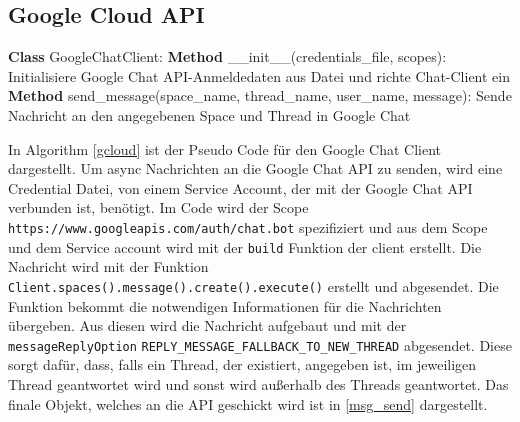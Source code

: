 \subsection{Google Cloud API}
\label{s:ent:capi}
\begin{algorithm}
    \caption{Google Chat Client}
    \begin{algorithmic}[1]
    \STATE \textbf{Class} GoogleChatClient:
    \STATE \textbf{Method} \_\_init\_\_(credentials\_file, scopes):
    \STATE \quad Initialisiere Google Chat API-Anmeldedaten aus Datei und richte Chat-Client ein
    \STATE \textbf{Method} send\_message(space\_name, thread\_name, user\_name, message):
    \STATE \quad Sende Nachricht an den angegebenen Space und Thread in Google Chat
    \end{algorithmic}
    \label{gcloud}
    \end{algorithm}
In Algorithm \ref*{gcloud} ist der Pseudo Code für den Google Chat Client dargestellt.
Um async Nachrichten an die Google Chat API zu senden, wird eine Credential Datei, von 
einem Service Account, der mit der Google Chat API verbunden ist, benötigt. Im Code wird der 
Scope \verb|https://www.googleapis.com/auth/chat.bot| spezifiziert und aus dem Scope und dem 
    Service account wird mit der \verb|build| Funktion der client erstellt. 
Die Nachricht wird mit der Funktion \verb|Client.spaces().message().create().execute()|
    erstellt und abgesendet. Die Funktion bekommt die notwendigen Informationen für die Nachrichten
     übergeben. Aus diesen wird die Nachricht aufgebaut und mit der \verb|messageReplyOption|
     \verb|REPLY_MESSAGE_FALLBACK_TO_NEW_THREAD| abgesendet. Diese sorgt dafür, dass, falls ein Thread, der existiert, angegeben ist, 
     im jeweiligen Thread geantwortet wird und sonst wird außerhalb des Threads geantwortet. Das finale Objekt, welches an die API
     geschickt wird ist in \ref*{msg_send} dargestellt.



